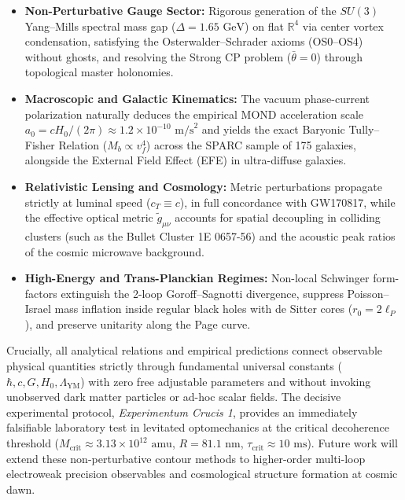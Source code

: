 \documentclass[11pt,a4paper]{article}
\theoremstyle{definition}
\begin{document}
\begin{itemize}
\item \textbf{Non-Perturbative Gauge Sector:} Rigorous generation of the $SU(3)$ Yang--Mills spectral mass gap ($\Delta = 1.65\text{ GeV}$) on flat $\mathbb{R}^4$ via center vortex condensation, satisfying the Osterwalder--Schrader axioms (OS0--OS4) without ghosts, and resolving the Strong CP problem ($\bar{\theta} = 0$) through topological master holonomies.
\item \textbf{Macroscopic and Galactic Kinematics:} The vacuum phase-current polarization naturally deduces the empirical MOND acceleration scale $a_0 = c H_0 / (2\pi) \approx 1.2 \times 10^{-10}\text{ m/s}^2$ and yields the exact Baryonic Tully--Fisher Relation ($M_b \propto v_f^4$) across the SPARC sample of 175 galaxies, alongside the External Field Effect (EFE) in ultra-diffuse galaxies.
\item \textbf{Relativistic Lensing and Cosmology:} Metric perturbations propagate strictly at luminal speed ($c_T \equiv c$), in full concordance with GW170817, while the effective optical metric $\tilde{g}_{\mu\nu}$ accounts for spatial decoupling in colliding clusters (such as the Bullet Cluster 1E 0657-56) and the acoustic peak ratios of the cosmic microwave background.
\item \textbf{High-Energy and Trans-Planckian Regimes:} Non-local Schwinger form-factors extinguish the 2-loop Goroff--Sagnotti divergence, suppress Poisson--Israel mass inflation inside regular black holes with de Sitter cores ($r_0 = 2\ell_P$), and preserve unitarity along the Page curve.
\end{itemize}

Crucially, all analytical relations and empirical predictions connect observable physical quantities strictly through fundamental universal constants ($\hbar, c, G, H_0, \Lambda_{\mathrm{YM}}$) with zero free adjustable parameters and without invoking unobserved dark matter particles or ad-hoc scalar fields. The decisive experimental protocol, \textit{Experimentum Crucis 1}, provides an immediately falsifiable laboratory test in levitated optomechanics at the critical decoherence threshold ($M_{\mathrm{crit}} \approx 3.13 \times 10^{12}\text{ amu}$, $R = 81.1\text{ nm}$, $\tau_{\mathrm{crit}} \approx 10\text{ ms}$). Future work will extend these non-perturbative contour methods to higher-order multi-loop electroweak precision observables and cosmological structure formation at cosmic dawn.
\end{document}

